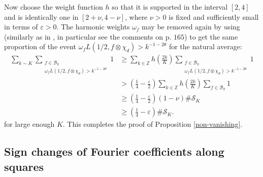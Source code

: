 \documentclass[a4paper,10pt,twoside]{amsart}
\theoremstyle{definition}
\numberwithin{equation}{section}
\newcommand\Z{\mathbb{Z}}
\newcommand\eps{\varepsilon}
\renewcommand\:{\colon}
\begin{document}
Now choose the weight function $h$ so that it is supported in the interval $[2,4]$ and is identically one in $[2+\nu,4-\nu]$, where $\nu>0$ is fixed and sufficiently small in terms of $\eps>0$. The harmonic weights $\omega_f$ may be removed again by using \cite[Lemma 8.9.]{Balkanova-Frolenkov2021} (similarly as in \cite{Iwaniec-Sarnak2000}, in particular see the comments on p. $165$) to get the same proportion of the event $\omega_fL(1/2,f\otimes\chi_d)>k^{-1-2\theta}$ for the natural average:
\begin{align}\label{non-zero-Fourier-coeff}
\sum_{k\sim K}\sum_{\substack{f\in \mathcal B_k\\
\omega_f L(1/2,f\otimes\chi_d)> k^{-1-2\theta}}}1 &\geq \sum_{k\in\Z}h\left(\frac{2k}K\right)\sum_{\substack{f\in \mathcal B_k \\
\omega_f L(1/2,f\otimes\chi_d)> k^{-1-2\theta}}}1 \nonumber\\
&>\left(\frac1{4}-\frac\eps2\right)\sum_{k\in\Z}h\left(\frac{2k}K\right)\sum_{f\in\mathcal B_k}1 \nonumber\\
&\geq\left(\frac14-\frac\eps2\right)(1-\nu)\#\mathcal S_K \nonumber \\
&\geq \left(\frac14-\eps\right)\#\mathcal S_K.
\end{align}
for large enough $K$. This completes the proof of Proposition \ref{non-vanishing}.

\subsection{Sign changes of Fourier coefficients along squares}
\end{document}
